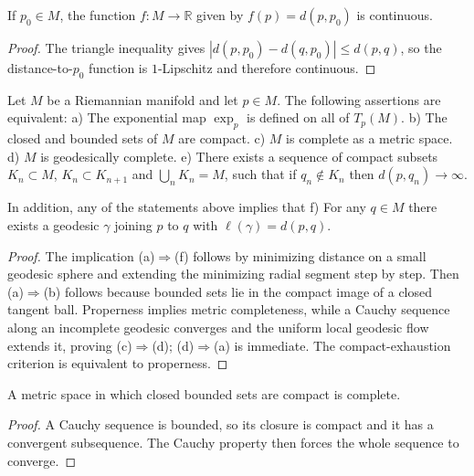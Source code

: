 \begin{corollary}

  \label{cor:dc-ch7-2-7}
  \leanok
If $p_0\in M$, the function $f:M\to\mathbb{R}$ given by $f(p)=d(p,p_0)$ is
  continuous.
\end{corollary}
\begin{proof}

  \leanok
\sketch The triangle inequality gives $|d(p,p_0)-d(q,p_0)|\le d(p,q)$, so the distance-to-$p_0$ function is $1$-Lipschitz and therefore continuous.
\end{proof}

\begin{theorem}
  \label{thm:dc-ch7-2-8}
  \leanok
  Let $M$ be a Riemannian manifold and let $p\in M$. The following assertions are
  equivalent:
a) The exponential map $\exp_p$ is defined on all of $T_p(M)$.
b) The closed and bounded sets of $M$ are compact.
c) $M$ is complete as a metric space.
d) $M$ is geodesically complete.
e) There exists a sequence of compact subsets $K_n\subset M$, $K_n\subset K_{n+1}$
     and $\bigcup_n K_n=M$, such that if $q_n\notin K_n$ then $d(p,q_n)\to\infty$.

In addition, any of the statements above implies that
f) For any $q\in M$ there exists a geodesic $\gamma$ joining $p$ to $q$ with
     $\ell(\gamma)=d(p,q)$.
\end{theorem}
\begin{proof}

  \leanok
\sketch The implication (a)$\Rightarrow$(f) follows by minimizing distance on a small geodesic sphere and extending the minimizing radial segment step by step. Then (a)$\Rightarrow$(b) follows because bounded sets lie in the compact image of a closed tangent ball. Properness implies metric completeness, while a Cauchy sequence along an incomplete geodesic converges and the uniform local geodesic flow extends it, proving (c)$\Rightarrow$(d); (d)$\Rightarrow$(a) is immediate. The compact-exhaustion criterion is equivalent to properness.
\end{proof}

\begin{lemma}

  \label{lem:dc-ch7-2-8-b-to-c}
  \mathlibok
A metric space in which closed bounded sets are compact is complete.
\end{lemma}
\begin{proof}
\sketch A Cauchy sequence is bounded, so its closure is compact and it has a
  convergent subsequence. The Cauchy property then forces the whole sequence to
  converge.
\end{proof}

